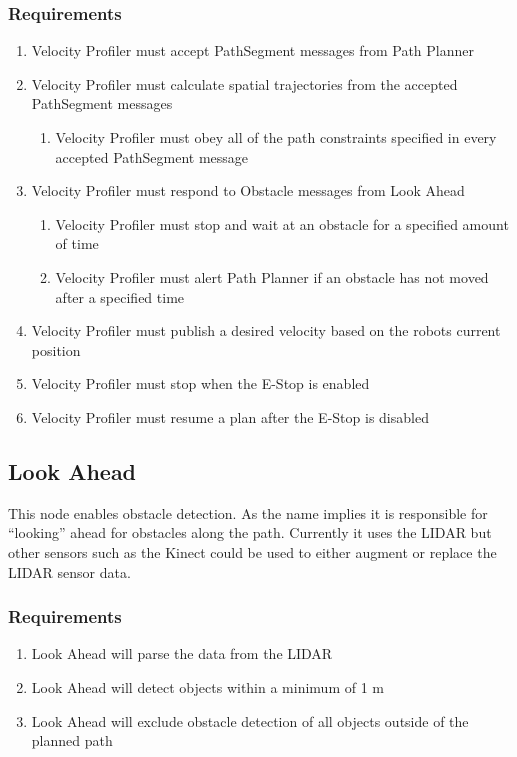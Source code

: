 \subsubsection{Requirements}
\begin{enumerate}
  \item Velocity Profiler must accept PathSegment messages from
    Path Planner
    \item Velocity Profiler must calculate spatial trajectories from
      the accepted PathSegment messages
      \begin{enumerate}
        \item Velocity Profiler must obey all of the path constraints
          specified in every accepted PathSegment message
         \end {enumerate}
\item Velocity Profiler must respond to Obstacle messages from Look
  Ahead
  \begin{enumerate}
    \item Velocity Profiler must stop and wait at an obstacle for a
      specified amount of time
      \item Velocity Profiler must alert Path Planner if an obstacle
        has not moved after a specified time
      \end{enumerate}
      \item Velocity Profiler must publish a desired velocity based on
        the robots current position
      \item Velocity Profiler must stop when the E-Stop is enabled
        \item Velocity Profiler must resume a plan after the E-Stop is
  disabled
  \end{enumerate}
      
  \subsection{Look Ahead}
  This node enables obstacle detection. As the name implies it is
  responsible for ``looking'' ahead for obstacles along the path.
  Currently it uses the LIDAR but other sensors such as the Kinect
  could be used to either augment or replace the LIDAR sensor data.

  \subsubsection{Requirements}
  \begin{enumerate}
  \item Look Ahead will parse the data from the LIDAR
  \item Look Ahead will detect objects within a minimum of 1 m
    \item Look Ahead will exclude obstacle detection of all objects
      outside of the planned path
      \end{enumerate}


